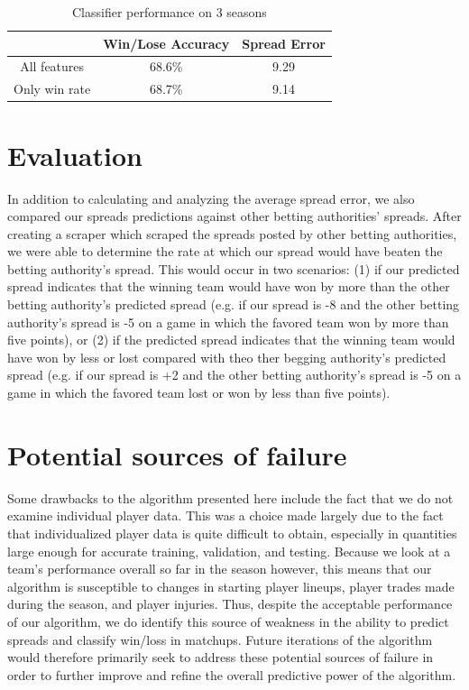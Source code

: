\documentclass{article}
\begin{document}
\begin{table}
  \begin{center}
    \begin{tabular}{ | c | c | c | }
      \hline
                         & Win/Lose Accuracy & Spread Error  \\ \hline
      All features       & 68.6\%            & 9.29         \\ \hline
      Only win rate      & 68.7\%            & 9.14         \\ \hline
    \end{tabular}
  \end{center}
  \caption{Classifier performance on 3 seasons}
\end{table}


\section{Evaluation}
In addition to calculating and analyzing the average spread error, we also compared our spreads predictions against other betting authorities' spreads. After creating a scraper which scraped the spreads posted by other betting authorities, we were able to determine the rate at which our spread would have beaten the betting authority's spread. This would occur in two scenarios: (1) if our predicted spread indicates that the winning team would have won by more than the other betting authority's predicted spread (e.g. if our spread is -8 and the other betting authority's spread is -5 on a game in which the favored team won by more than five points), or (2) if the predicted spread indicates that the winning team would have won by less or lost compared with theo ther begging authority's predicted spread (e.g. if our spread is +2 and the other betting authority's spread is -5 on a game in which the favored team lost or won by less than five points).


\section{Potential sources of failure}
Some drawbacks to the algorithm presented here include the fact that we do not examine individual player data. This was a choice made largely due to the fact that individualized player data is quite difficult to obtain, especially in quantities large enough for accurate training, validation, and testing. Because we look at a team's performance overall so far in the season however, this means that our algorithm is susceptible to changes in starting player lineups, player trades made during the season, and player injuries. Thus, despite the acceptable performance of our algorithm, we do identify this source of weakness in the ability to predict spreads and classify win/loss in matchups. Future iterations of the algorithm would therefore primarily seek to address these potential sources of failure in order to further improve and refine the overall predictive power of the algorithm.
\end{document}

